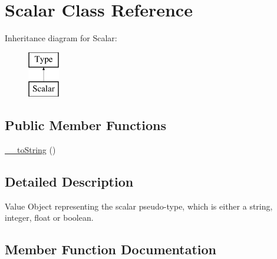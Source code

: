 \hypertarget{classphp_documentor_1_1_reflection_1_1_types_1_1_scalar}{}\section{Scalar Class Reference}
\label{classphp_documentor_1_1_reflection_1_1_types_1_1_scalar}
Inheritance diagram for Scalar\+:\begin{figure}[H]
\begin{center}
\leavevmode
\includegraphics[height=2.000000cm]{classphp_documentor_1_1_reflection_1_1_types_1_1_scalar}
\end{center}
\end{figure}
\subsection*{Public Member Functions}
\begin{DoxyCompactItemize}
\item 
\mbox{\hyperlink{classphp_documentor_1_1_reflection_1_1_types_1_1_scalar_a7516ca30af0db3cdbf9a7739b48ce91d}{\+\_\+\+\_\+to\+String}} ()
\end{DoxyCompactItemize}


\subsection{Detailed Description}
Value Object representing the \textquotesingle{}scalar\textquotesingle{} pseudo-\/type, which is either a string, integer, float or boolean. 

\subsection{Member Function Documentation}
\mbox{\label{classphp_documentor_1_1_reflection_1_1_types_1_1_scalar_a7516ca30af0db3cdbf9a7739b48ce91d}} 
